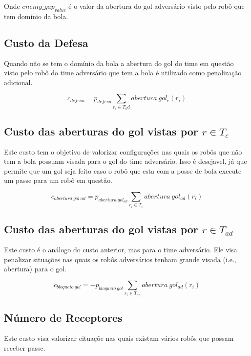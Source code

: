 Onde $enemy{\_}gap_{value}$ é o valor da abertura do gol adversário visto
pelo robô que tem domínio da bola.

\subsection{Custo da Defesa}
Quando não se tem o domínio da bola a abertura do gol do time em questão
visto pelo robô do time adversário que tem a bola é utilizado
como penalização adicional.

\begin{dmath}
  c_{defesa} = p_{defesa}
   \sum_{r_i \in T_ad} abertura{\ }gol_c(r_i)
\end{dmath}

\subsection{Custo das aberturas do gol vistas por $r\in T_c$}

Este custo tem o objetivo de valorizar configurações nas quais
os robôs que não tem a bola possuam visada para o gol do time
adversário. Isso
é desejavel, já que permite que um gol seja feito caso o robô
que esta com a posse de bola execute um passe para um robô
em questão.

\begin{dmath}
   c_{abertura{\ }gol{\ }ad} = p_{abertura{\ }gol_{ad}}
    \sum_{r_i \in T_c} abertura{\ }gol_{ad}(r_i)
\end{dmath}

\subsection{Custo das aberturas do gol vistas por $r\in T_{ad}$}

Este custo é o análogo do custo anterior, mas para o
time adversário. Ele visa penalizar situações nas quais
os robôs adversários tenham grande visada (i.e., abertura)
para o gol. 

\begin{dmath}
   c_{bloqueio{\ }gol} = - p_{bloqueio{\ }gol}
    \sum_{r_i \in T_{ad}} abertura{\ }gol_{ad}(r_i)
\end{dmath}

\subsection{Número de Receptores}

Este custo visa valorizar cituaçõe nas quais existam
vários robôs que possam receber passe.

